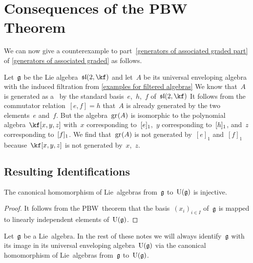 \section{Consequences of the PBW Theorem}


\begin{example}
	\label{converse to warning about generating set for the associated graded}
	We can now give a counterexample to part~\ref{generators of associated graded part} of \cref{generators of associated graded} as follows.

	Let~$\mathfrak{g}$ be the Lie algebra~$\sllie(2, \kf)$ and let~$A$ be its universal enveloping algebra with the induced filtration from \cref{examples for filtered algebras}
	We know that~$A$ is generated as a~\algebra{$\kf$} by the standard basis~$e$,~$h$,~$f$ of~$\sllie(2, \kf)$
	It follows from the commutator relation~$[e,f] = h$ that~$A$ is already generated by the two elements~$e$ and~$f$.
	But the algebra~$\gr(A)$ is isomorphic to the polynomial algebra~$\kf[x, y, z]$ with~$x$ corresponding to~$\lbrack e \rbrack_1$,~$y$ corresponding to~$\lbrack h\rbrack_1$, and~$z$ corresponding to~$\lbrack f\rbrack_1$.
	We find that~$\gr(A)$ is not generated by~$[e]_1$ and~$[f]_1$ because~$\kf[x,y,z]$ is not generated by~$x$,~$z$.
\end{example}



\subsection{Resulting Identifications}

\begin{proposition}
	\label{embedding into uea}
	The canonical homomorphism of Lie~algebras from~$\mathfrak{g}$ to~$\operatorname{U}(\mathfrak{g})$ is injective.
\end{proposition}


\begin{proof}
	It follows from the PBW~theorem that the basis~$(x_i)_{i \in I}$ of~$\mathfrak{g}$ is mapped to linearly independent elements of~$\operatorname{U}(\mathfrak{g})$.
\end{proof}


\begin{convention}
	\label{identification of lie algebra with image in its uea}
	Let~$\mathfrak{g}$ be a Lie~algebra.
	In the rest of these notes we will always identify~$\mathfrak{g}$ with its image in its universal enveloping algebra~$\operatorname{U}(\mathfrak{g})$ via the canonical homomorphism of Lie~algebras from~$\mathfrak{g}$ to~$\operatorname{U}(\mathfrak{g})$.
\end{convention}


